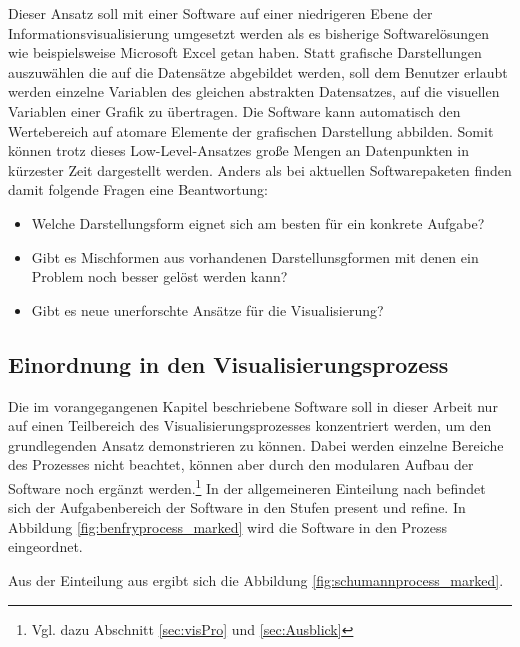 \documentclass[a4paper, 12pt, DIVcalc, onepage, pdftex, headsepline, footsepline]{scrreprt}
\begin{document}
Dieser Ansatz soll mit einer Software auf einer niedrigeren Ebene der Informationsvisualisierung umgesetzt werden als
es bisherige Softwarelösungen wie beispielsweise Microsoft Excel getan haben. Statt grafische Darstellungen auszuwählen
die auf die Datensätze abgebildet werden, soll dem Benutzer erlaubt werden einzelne Variablen des gleichen abstrakten Datensatzes,
auf die visuellen Variablen einer Grafik zu übertragen. Die Software kann automatisch den Wertebereich auf atomare Elemente der
grafischen Darstellung abbilden. Somit können trotz dieses Low-Level-Ansatzes große Mengen an Datenpunkten
in kürzester Zeit dargestellt werden. Anders als bei aktuellen Softwarepaketen finden damit folgende Fragen
eine Beantwortung:
\begin{itemize}
\item Welche Darstellungsform eignet sich am besten für ein konkrete Aufgabe?
\item Gibt es Mischformen aus vorhandenen Darstellunsgformen mit denen ein Problem noch besser gelöst werden kann?
\item Gibt es neue unerforschte Ansätze für die Visualisierung?
\end{itemize}

\subsection{Einordnung in den Visualisierungsprozess}
Die im vorangegangenen Kapitel beschriebene Software soll in dieser Arbeit nur auf einen Teilbereich
des Visualisierungsprozesses konzentriert werden, um den grundlegenden Ansatz demonstrieren zu können. Dabei werden
einzelne Bereiche des Prozesses nicht beachtet, können aber durch den modularen Aufbau der Software
noch ergänzt werden.\footnote{Vgl. dazu Abschnitt \ref{sec:visPro} und \ref{sec:Ausblick}} In der
allgemeineren Einteilung nach \citep{BenFry} befindet sich der Aufgabenbereich der Software in den
Stufen present und refine. In Abbildung \ref{fig:benfryprocess_marked} wird die Software in den Prozess
eingeordnet.

Aus der Einteilung aus \citep{Schumann} ergibt sich die Abbildung \ref{fig:schumannprocess_marked}.
\end{document}
